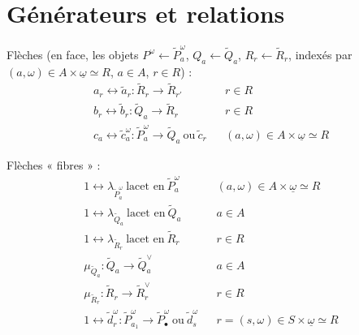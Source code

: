 \documentclass[11pt,a4paper]{article}
\begin{document}
\section{Générateurs et relations}


Flèches  (en face, les objets $P^\omega \leftarrow \widetilde{P}^\omega_a$, $Q_a \leftarrow \widetilde{Q}_a$, $R_r \leftarrow \widetilde{R}_r$, indexés par $(a,\omega) \in A\times\underline{\omega} \simeq R$, $a\in A$, $r\in R$) :
\[
\begin{array}{lll}
a_r \leftrightarrow \tilde a_r : \widetilde{R}_r \to \widetilde{R}_{r'} & & r \in R\\
b_r \leftrightarrow \tilde b_r : \widetilde{Q}_a \to \widetilde{R}_r & & r\in R\\
c_a \leftrightarrow \tilde c^\omega_a : \widetilde{P}^\omega_a \to \widetilde{Q}_a \ \text{ou}\ \tilde c_r & & (a,\omega)\in A\times\underline{\omega}\simeq R
\end{array}
\]

Flèches « fibres »  :
\[
\begin{array}{lll}
1 \leftrightarrow \lambda_{\widetilde{P}^\omega_a}\ \text{lacet en}\ \widetilde{P}^\omega_a & & (a,\omega)\in A\times\underline{\omega}\simeq R\\
1 \leftrightarrow \lambda_{\widetilde{Q}_a}\ \text{lacet en}\ \widetilde{Q}_a & & a \in A\\
1 \leftrightarrow \lambda_{\widetilde{R}_r}\ \text{lacet en}\ \widetilde{R}_r & & r\in R\\
\mu_{\widetilde{Q}_a} : \widetilde{Q}_a \to \widetilde{Q}_a^\vee & & a\in A\\
\mu_{\widetilde{R}_r} : \widetilde{R}_r \to \widetilde{R}_r^\vee & & r\in R\\
1 \leftrightarrow \tilde d^\omega_r : \widetilde{P}^\omega_{a_1} \to \widetilde{P}^\omega_{\bullet}\ \text{ou}\ \tilde d^\omega_s & & r = (s,\omega)\in S\times\underline{\omega}\simeq R
\end{array}
\]
\end{document}
